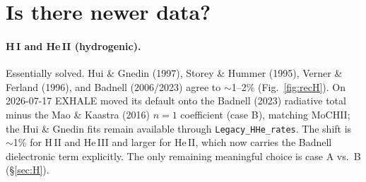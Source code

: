 \documentclass[english,a4paper]{my_memo}
\begin{document}
\section{Is there newer data?}\label{sec:newer}

\paragraph{H\,I and He\,II (hydrogenic).} Essentially solved. Hui \&
Gnedin (1997), Storey \& Hummer (1995), Verner \& Ferland (1996), and
Badnell (2006/2023) agree to $\sim$1--2\% (Fig.~\ref{fig:recH}). On
2026-07-17 EXHALE moved its default onto the Badnell (2023) radiative total
minus the Mao \& Kaastra (2016) $n=1$ coefficient (case B), matching MoCHII;
the Hui \& Gnedin fits remain available through \texttt{Legacy\_HHe\_rates}.
The shift is $\sim$1\% for H\,II and He\,III and larger for He\,II, which now
carries the Badnell dielectronic term explicitly. The only remaining
meaningful choice is case A vs.\ B (\S\ref{sec:H}).
\end{document}
